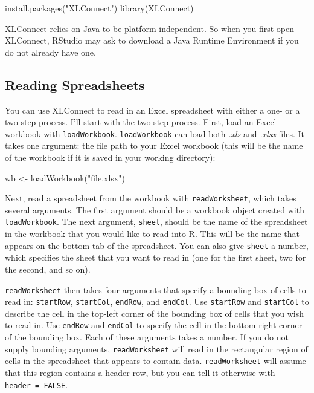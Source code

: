 \documentclass[
  letterpaper,
  DIV=11,
  numbers=noendperiod]{scrbook}
\newenvironment{Shaded}{\begin{snugshade}}{\end{snugshade}}
\newcommand{\FunctionTok}[1]{\textcolor[rgb]{0.28,0.35,0.67}{#1}}
\newcommand{\NormalTok}[1]{\textcolor[rgb]{0.00,0.23,0.31}{#1}}
\newcommand{\OtherTok}[1]{\textcolor[rgb]{0.00,0.23,0.31}{#1}}
\newcommand{\StringTok}[1]{\textcolor[rgb]{0.13,0.47,0.30}{#1}}
\begin{document}
\begin{Shaded}
\begin{Highlighting}[]
\FunctionTok{install.packages}\NormalTok{(}\StringTok{"XLConnect"}\NormalTok{)}
\FunctionTok{library}\NormalTok{(XLConnect)}
\end{Highlighting}
\end{Shaded}

XLConnect relies on Java to be platform independent. So when you first
open XLConnect, RStudio may ask to download a Java Runtime Environment
if you do not already have one.

\subsection{Reading Spreadsheets}\label{reading-spreadsheets}

You can use XLConnect to read in an Excel spreadsheet with either a one-
or a two-step process. I'll start with the two-step process. First, load
an Excel workbook with \texttt{loadWorkbook}. \texttt{loadWorkbook} can
load both \emph{.xls} and \emph{.xlsx} files. It takes one argument: the
file path to your Excel workbook (this will be the name of the workbook
if it is saved in your working directory):

\begin{Shaded}
\begin{Highlighting}[]
\NormalTok{wb }\OtherTok{\textless{}{-}} \FunctionTok{loadWorkbook}\NormalTok{(}\StringTok{"file.xlsx"}\NormalTok{)}
\end{Highlighting}
\end{Shaded}

Next, read a spreadsheet from the workbook with \texttt{readWorksheet},
which takes several arguments. The first argument should be a workbook
object created with \texttt{loadWorkbook}. The next argument,
\texttt{sheet}, should be the name of the spreadsheet in the workbook
that you would like to read into R. This will be the name that appears
on the bottom tab of the spreadsheet. You can also give \texttt{sheet} a
number, which specifies the sheet that you want to read in (one for the
first sheet, two for the second, and so on).

\texttt{readWorksheet} then takes four arguments that specify a bounding
box of cells to read in: \texttt{startRow}, \texttt{startCol},
\texttt{endRow}, and \texttt{endCol}. Use \texttt{startRow} and
\texttt{startCol} to describe the cell in the top-left corner of the
bounding box of cells that you wish to read in. Use \texttt{endRow} and
\texttt{endCol} to specify the cell in the bottom-right corner of the
bounding box. Each of these arguments takes a number. If you do not
supply bounding arguments, \texttt{readWorksheet} will read in the
rectangular region of cells in the spreadsheet that appears to contain
data. \texttt{readWorksheet} will assume that this region contains a
header row, but you can tell it otherwise with
\texttt{header\ =\ FALSE}.
\end{document}
